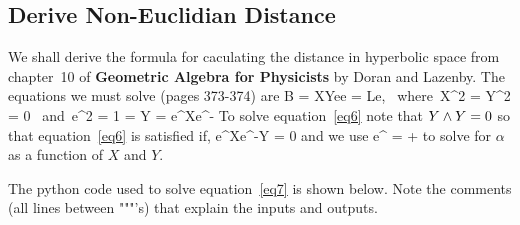 \documentclass{article}
\begin{document}
\subsection{Derive Non-Euclidian Distance}

We shall derive the formula for caculating the distance in hyperbolic space
from chapter~10 of {\bf Geometric Algebra for Physicists} by Doran and Lazenby. The equations we must 
solve (pages 373-374) are
\be
 B = \lp X\W Y\W e\rp e = Le, \mbox{ where }X^{2} = Y^{2} = 0 \mbox{ and }e^{2} = 1
\ee
\be
	 = 
\ee
\be\label{eq6}
	Y = e^{}Xe^{-}
\ee
To solve equation~\ref{eq6} note that $Y\wedge Y = 0$ so that equation~\ref{eq6} is satisfied if,
\be\label{eq7}
    \lp e^{}Xe^{-}\rp \cdot Y = 0
\ee
and we use
\be
	e^{} = \cosh\lp{}\rp+\sinh\lp{}\rp{}
\ee
to solve for $\alpha$ as a function of $X$ and $Y$.

The python code used to solve equation~\ref{eq7} is shown below.  Note the comments (all lines
between """'s) that explain the inputs and outputs.
\end{document}
